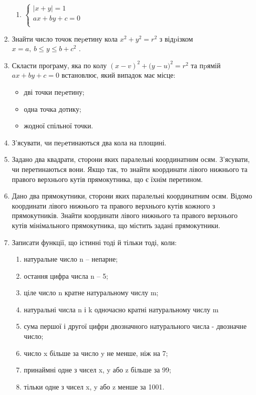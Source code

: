 \documentclass[]{article}
\makeatletter
\newcommand{\xslalph}[1]{\expandafter\@xslalph\csname c@#1\endcsname}
\newcommand{\@xslalph}[1]{%
    \ifcase#1\or а\or б\or в\or г\or д\or e\or є\or ж\or з\or i%
    \or й\or к\or л\or м\or н\or о\or п\or р\or с\or т%
    \or у\or ф\or х\or ц\or ч\or ш\or ю\or я\or аа\or бб\or вв%
    \else\@ctrerr\fi%
}
\makeatother
\begin{document}
\begin{enumerate}
\begin{enumerate}[label=\xslalph*)]
\item \(\left\{ \begin{matrix}
\left| x + y \right| = 1 \\
ax + by + c = 0 \\
\end{matrix} \right.\ \)
\end{enumerate}

\item
  Знайти число точок пеpетину кола \(x^{2} + y^{2} = r^{2}\) з відpізком
  \(x = a,\ b \leq y \leq b + c^{2}\) .
\item
  Скласти програму, яка по колу
  \({(x - v)}^{2} + ({y - u)}^{2} = r^{2}\) та пpямій
  \(ax + by + c = 0\) встановлює, який випадок має місце:
\begin{itemize}
\item дві точки пеpетину;
\item одна точка дотику;
\item жодної спільної точки.
\end{itemize}

\item
  З'ясувати, чи пеpетинаються два кола на площині.
\item
  Задано два квадрати, сторони яких паралельні координатним осям.
  З'ясувати, чи перетинаються вони. Якщо так, то знайти координати
  лівого нижнього та правого верхнього кутів прямокутника, що є їхнім
  перетином.
\item
  Дано два прямокутники, сторони яких паралельні координатним осям.
  Відомо координати лівого нижнього та правого верхнього кутів кожного з
  прямокутників. Знайти координати лівого нижнього та правого верхнього
  кутів мінімального прямокутника, що містить задані прямокутники.
\item
  Записати функції, що істинні тоді й тільки тоді, коли:
\begin{enumerate}[label=\xslalph*)]
\item натуральне число n -- непарне;
\item остання цифра числа n -- 5;
\item ціле число n кратне натуральному числу m;
\item натуральні числа n і k одночасно кратні натуральному числу m
\item сума першої і другої цифри двозначного натурального числа - двозначне
число;
\item число x більше за число y не менше, ніж на 7;
\item принаймні одне з чисел x, y або z більше за 99;
\item тільки одне з чисел x, y або z менше за 1001.
\end{enumerate}


\end{enumerate}
\end{document}
